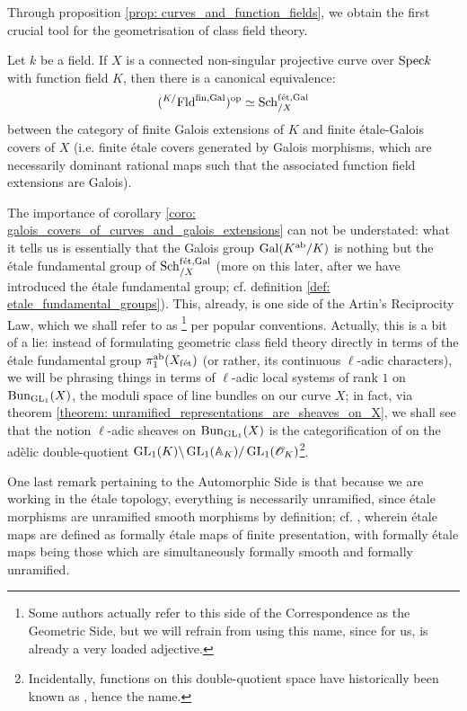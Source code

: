         Through proposition \ref{prop: curves_and_function_fields}, we obtain the first crucial tool for the geometrisation of class field theory.
        \begin{corollary} \label{coro: galois_covers_of_curves_and_galois_extensions}
            Let $k$ be a field. If $X$ is a connected non-singular projective curve over $\mathrm{Spec} k$ with function field $K$, then there is a canonical equivalence:
                $$({}^{K/}\mathrm{Fld}^{\mathrm{fin}, \mathrm{Gal}})^{\mathrm{op}} \simeq \mathrm{Sch}_{/X}^{\mathrm{f\acute{e}t}, \mathrm{Gal}}$$
            between the category of finite Galois extensions of $K$ and finite \'etale-Galois covers of $X$ (i.e. finite \'etale covers generated by Galois morphisms, which are necessarily dominant rational maps such that the associated function field extensions are Galois). 
        \end{corollary}
        The importance of corollary \ref{coro: galois_covers_of_curves_and_galois_extensions} can not be understated: what it tells us is essentially that the Galois group $\mathrm{Gal}(K^{\mathrm{ab}}/K)$ is nothing but the \'etale fundamental group of $\mathrm{Sch}_{/X}^{\mathrm{f\acute{e}t}, \mathrm{Gal}}$ (more on this later, after we have introduced the \'etale fundamental group; cf. definition \ref{def: etale_fundamental_groups}). This, already, is one side of the Artin's Reciprocity Law, which we shall refer to as \footnote{Some authors actually refer to this side of the Correspondence as the Geometric Side, but we will refrain from using this name, since for us,  is already a very loaded adjective.} per popular conventions. Actually, this is a bit of a lie: instead of formulating geometric class field theory directly in terms of the \'etale fundamental group $\pi_1^{\mathrm{ab}}(X_{\mathrm{f\acute{e}t}})$ (or rather, its continuous $\ell$-adic characters), we will be phrasing things in terms of $\ell$-adic local systems of rank $1$ on $\mathrm{Bun}_{\operatorname{GL}_1}(X)$, the moduli space of line bundles on our curve $X$; in fact, via theorem \ref{theorem: unramified_representations_are_sheaves_on_X}, we shall see that the notion $\ell$-adic sheaves on $\mathrm{Bun}_{\operatorname{GL}_1}(X)$ is the categorification of  on the ad\`elic double-quotient $\operatorname{GL}_1(K) \backslash \operatorname{GL}_1(\mathbb{A}_K) / \operatorname{GL}_1(\mathscr{O}_K)$\footnote{Incidentally, functions on this double-quotient space have historically been known as , hence the name.}. 
        
        One last remark pertaining to the Automorphic Side is that because we are working in the \'etale topology, everything is necessarily unramified, since \'etale morphisms are unramified smooth morphisms by definition; cf. \cite[\href{https://stacks.math.columbia.edu/tag/00UP}{Tag 00UP}, \href{https://stacks.math.columbia.edu/tag/00U0}{Tag 00U0}, \href{https://stacks.math.columbia.edu/tag/00TH}{Tag 00TH}, and \href{https://stacks.math.columbia.edu/tag/00US}{Tag 00US}]{stacks}, wherein \'etale maps are defined as formally \'etale maps of finite presentation, with formally \'etale maps being those which are simultaneously formally smooth and formally unramified.
    
